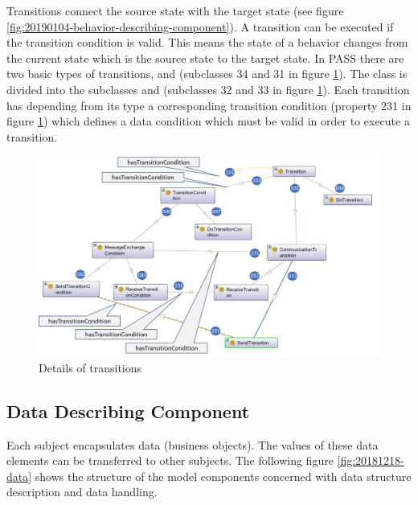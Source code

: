 Transitions connect the source state with the target state (see figure \ref{fig:20190104-behavior-describing-component}). A transition can be executed if the transition condition is valid. This means the state of a behavior changes from the current state which is the source state to the target state. In PASS there are two basic types of transitions,  and  (subclasses 34 and 31 in figure \ref{fig:20190105-transitions}). The class  is divided into the subclasses  and  (subclasses 32 and 33 in figure \ref{fig:20190105-transitions}). Each transition has depending from its type a corresponding transition condition (property 231 in figure  \ref{fig:20190105-transitions}) which defines a data condition which must be valid in order to execute a transition.

\begin{figure}[htbp]
	\centering
	\includegraphics[width=1.0\linewidth]{Figures/Ontology/SubjectBehavior/20190105-Transitions}
	\caption[Details of transitions]{Details of transitions}
	\label{fig:20190105-transitions}
\end{figure}


\subsection{Data Describing Component}

Each subject encapsulates data (business objects). The values of these data elements can be transferred to other subjects. The following figure \ref{fig:20181218-data} shows the structure of the model components concerned with data structure description and data handling.

